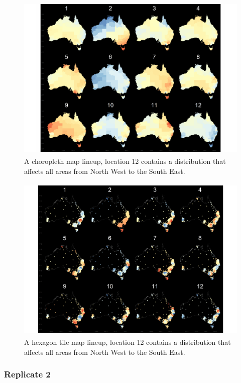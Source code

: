\documentclass{monashthesis}
\begin{document}
\begin{figure}[H]
\centering
\includegraphics[height=8cm]{lineups/nwse-geo2-1.pdf}
\caption{\label{fig:nwse-geo2}A choropleth map lineup, location 12 contains a distribution that affects all areas from North West to the South East.}
\end{figure}

\begin{figure}[H]
\centering
\includegraphics[height=8cm]{lineups/nwse-hex2-1.pdf}
\caption{\label{fig:nwse-hex2}A hexagon tile map lineup, location 12 contains a distribution that affects all areas from North West to the South East.}
\end{figure}

\hypertarget{replicate-2-2}{%
\subsubsection{Replicate 2}\label{replicate-2-2}}
\end{document}
